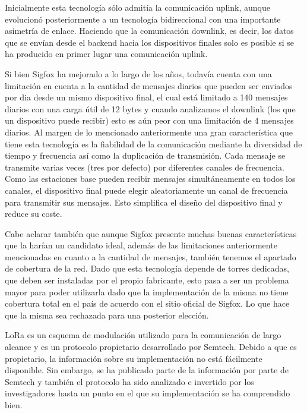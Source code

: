 Inicialmente esta tecnología sólo admitía la comunicación uplink, aunque evolucionó posteriormente a un tecnología bidireccional con una importante asimetría de enlace. Haciendo que la comunicación downlink, es decir, los datos que se envían desde el backend hacia los dispositivos finales solo es posible si se ha producido en primer lugar una comunicación uplink.

Si bien Sigfox ha mejorado a lo largo de los años, todavía cuenta con una limitación en cuenta a la cantidad de mensajes diarios que pueden ser enviados por dia desde un mismo dispositivo final, el cual está limitado a 140 mensajes diarios con una carga útil de 12 bytes y cuando analizamos el downlink (los que un dispositivo puede recibir) esto es aún peor con una limitación de 4 mensajes diarios. Al margen de lo mencionado anteriormente una gran característica que tiene esta tecnología es la fiabilidad de la comunicación mediante la diversidad de tiempo y frecuencia así como la duplicación de transmisión. Cada mensaje se transmite varias veces
(tres por defecto) por diferentes canales de frecuencia. Como las estaciones base pueden recibir mensajes simultáneamente en todos los canales, el dispositivo final puede elegir aleatoriamente un canal de frecuencia para transmitir sus mensajes. Esto simplifica el diseño del dispositivo final y reduce su coste.

Cabe aclarar también que aunque Sigfox presente muchas buenas características que la harían un candidato ideal, además de las limitaciones anteriormente mencionadas en cuanto a la cantidad de mensajes, también tenemos el apartado de cobertura de la red. Dado que esta tecnología depende de torres dedicadas, que deben ser instaladas por el propio fabricante, esto pasa a ser un problema mayor para poder utilizarla dado que la implementación de la misma no tiene cobertura total en el país de acuerdo con el sitio oficial de Sigfox. Lo que hace que la misma sea rechazada para una posterior elección.

LoRa es un esquema de modulación utilizado para la comunicación de largo alcance y es un protocolo propietario desarrollado por Semtech. Debido a que es propietario, la información sobre su implementación no está fácilmente disponible. Sin embargo, se ha publicado parte de la información por parte de Semtech y también el protocolo ha sido analizado e invertido por los investigadores hasta un punto en el que su implementación se ha comprendido bien. 

